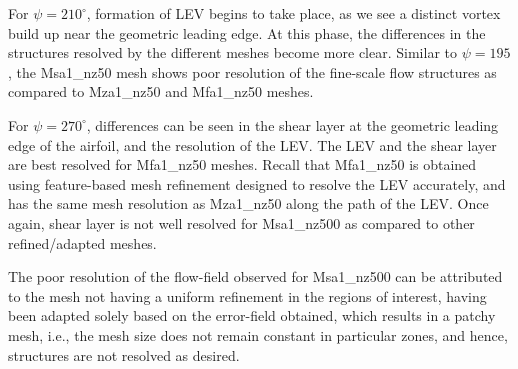 



For $\psi=210^\circ$, formation of LEV begins to take place, as we see a distinct vortex build up near the geometric leading edge. 
At this phase, the differences in the structures resolved by the different meshes become more clear.
Similar to $\psi=195$, the Msa1\_nz50 mesh shows poor resolution of the fine-scale flow structures as compared to  Mza1\_nz50 and Mfa1\_nz50 meshes.

For $\psi=270^\circ$, differences can be seen in the shear layer at the geometric leading edge of the airfoil, and the resolution of the LEV. 
The LEV and the shear layer are best resolved for Mfa1\_nz50 meshes. 
Recall that Mfa1\_nz50 is obtained using feature-based mesh refinement designed to resolve the LEV accurately, and has the same mesh resolution as Mza1\_nz50 along the path of the LEV. 
Once again, shear layer is not well resolved for Msa1\_nz500 as compared to other refined/adapted meshes.

The poor resolution of the flow-field observed for Msa1\_nz500 can be attributed to the mesh not having a uniform refinement in the regions of interest, having been adapted solely based on the error-field obtained, which results in a patchy mesh, i.e., the mesh size does not remain constant in particular zones, and hence, structures are not resolved as desired.

